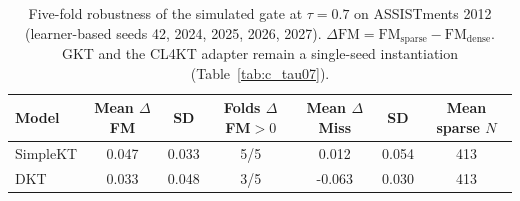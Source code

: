 \begin{table}[htbp]
\caption{Five-fold robustness of the simulated gate at $\tau=0.7$ on ASSISTments 2012 (learner-based seeds 42, 2024, 2025, 2026, 2027). $\Delta\mathrm{FM}=\mathrm{FM}_{\mathrm{sparse}}-\mathrm{FM}_{\mathrm{dense}}$. GKT and the CL4KT adapter remain a single-seed instantiation (Table~\ref{tab:c_tau07}).}
\label{tab:c_fivefold}
\centering
\footnotesize
\begin{tabular}{lcccccc}
\toprule
Model & Mean $\Delta$FM & SD & Folds $\Delta$FM$>0$ & Mean $\Delta$Miss & SD & Mean sparse $N$ \\
\midrule
SimpleKT & 0.047 & 0.033 & 5/5 & 0.012 & 0.054 & 413 \\
DKT & 0.033 & 0.048 & 3/5 & -0.063 & 0.030 & 413 \\
\bottomrule
\end{tabular}
\end{table}
